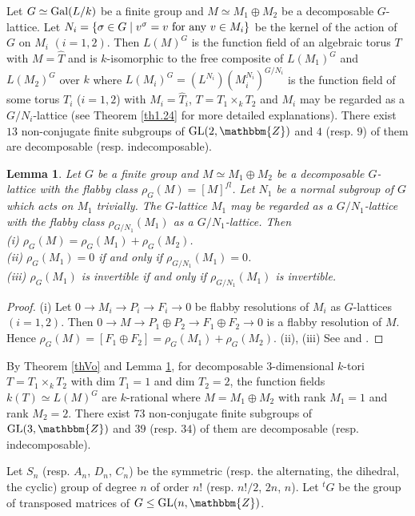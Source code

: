 \documentclass{amsart}
\theoremstyle{plain}
\newtheorem{lemma}[theorem]{Lemma}
\theoremstyle{definition}
\theoremstyle{remark}
\newcommand{\bZ}{\mathbbm{Z}}\newcommand{\bQ}{\mathbbm{Q}}
\newcommand{\GL}{{\rm GL}}\newcommand{\SL}{{\rm SL}}
\newcounter{sub}\def\tr{\mbox{tr }}
\begin{document}
Let $G\simeq {\rm Gal}(L/k)$ be a finite group and 
$M\simeq M_1\oplus M_2$ be a decomposable $G$-lattice. 
Let $N_i=\{\sigma\in G\mid v^\sigma=v\ {\rm for\ any}\ v\in M_i\}$ 
be the kernel of the action of $G$ on $M_i$ $(i=1,2)$. 
Then $L(M)^G$ is the function field of an algebraic torus $T$ 
with $M=\widehat{T}$ 
and is $k$-isomorphic to the free composite of 
$L(M_1)^G$ and $L(M_2)^G$ over $k$ where 
$L(M_i)^G=(L^{N_i})(M_i^{N_i})^{G/N_i}$ 
is the function field of some torus $T_i$ ($i=1,2$) with 
$M_i=\widehat{T}_i$, 
$T=T_1\times_k T_2$ 
and $M_i$ may be regarded as a $G/N_i$-lattice 
(see Theorem \ref{th1.24} for more detailed explanations). 
There exist $13$ non-conjugate finite subgroups of $\GL(2,\bZ)$ 
and $4$ (resp. $9$) of them are decomposable (resp. indecomposable). 
%
\begin{lemma}\label{lemp1}
Let $G$ be a finite group and
$M \simeq M_1 \oplus M_2$ be a decomposable $G$-lattice with 
the flabby class $\rho_G(M)=[M]^{fl}$. 
Let $N_1$ be a normal subgroup of $G$ which acts on $M_1$ trivially. 
The $G$-lattice $M_1$ may be regarded as a $G/N_1$-lattice with the 
flabby class $\rho_{G/N_1}(M_1)$ as a $G/N_1$-lattice. 
Then\\
{\rm (i)} $\rho_G(M)=\rho_G(M_1)+\rho_G(M_2)$.\\
{\rm (ii)} $\rho_{G}(M_1)=0$ if and only if $\rho_{G/N_1}(M_1)=0$.\\
{\rm (iii)} $\rho_G(M_1)$ is invertible if and only if 
$\rho_{G/N_1}(M_1)$ is invertible.
\end{lemma}
%
\begin{proof}
(i) Let $0 \rightarrow M_i \rightarrow P_i \rightarrow F_i
\rightarrow 0$ be flabby resolutions of $M_i$ as $G$-lattices $(i=1,2)$. 
Then 
$0 \rightarrow M \rightarrow P_1 \oplus P_2
\rightarrow F_1 \oplus F_2 \rightarrow 0$
is a flabby resolution of $M$. 
Hence $\rho_G(M)=[F_1 \oplus F_2]=\rho_G(M_1)+\rho_G(M_2)$. 
(ii), (iii) See \cite[Lemme 2]{CTS77} and \cite[Lemma 4.1]{Kan09}.
\end{proof}
%
By Theorem \ref{thVo} and Lemma \ref{lemp1}, 
for decomposable $3$-dimensional $k$-tori $T=T_1\times_k T_2$ 
with dim $T_1=1$ and dim $T_2=2$, 
the function fields $k(T)\simeq L(M)^G$ are $k$-rational where 
$M=M_1\oplus M_2$ with rank $M_1=1$ and rank $M_2=2$. 
There exist $73$ non-conjugate finite subgroups of $\GL(3,\bZ)$ 
and $39$ (resp. $34$) of them are decomposable (resp. indecomposable). 
%

Let $S_n$ (resp. $A_n$, $D_n$, $C_n$) be the symmetric 
(resp. the alternating, the dihedral, the cyclic) group 
of degree $n$ of order $n!$ (resp. $n!/2$, $2n$, $n$). 
Let ${}^tG$ be the group of transposed matrices of $G\leq \GL(n,\bZ)$.
\end{document}
